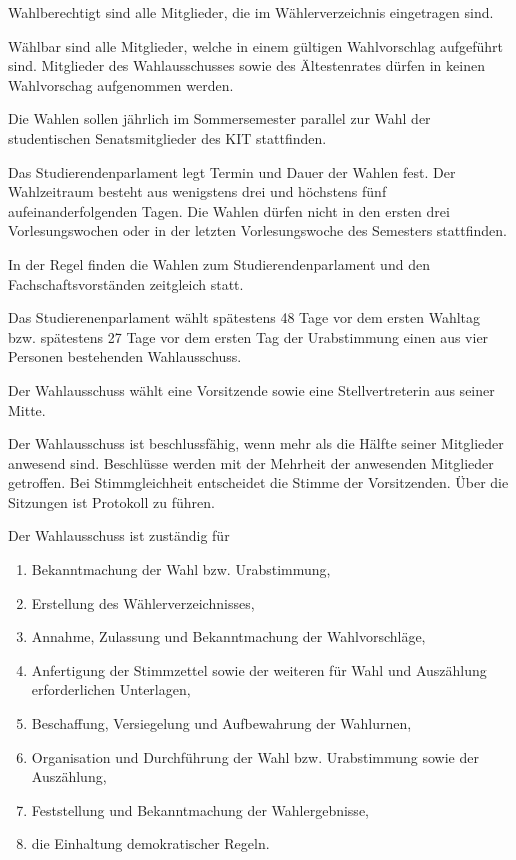 \begin{jurdoc}
Wahlberechtigt sind alle Mitglieder, die im Wählerverzeichnis eingetragen sind.

Wählbar sind alle Mitglieder, welche in einem gültigen Wahlvorschlag aufgeführt sind. Mitglieder des Wahlausschusses sowie des Ältestenrates dürfen in keinen Wahlvorschag aufgenommen werden.

\label{wahl:walhtermin}
Die Wahlen sollen jährlich im Sommersemester parallel zur Wahl der studentischen Senatsmitglieder des KIT stattfinden.

Das Studierendenparlament legt Termin und Dauer der Wahlen fest. Der Wahlzeitraum besteht aus wenigstens drei und höchstens fünf aufeinanderfolgenden Tagen. Die Wahlen dürfen nicht in den ersten drei Vorlesungswochen oder in der letzten Vorlesungswoche des Semesters stattfinden.

In der Regel finden die Wahlen zum Studierendenparlament und den Fachschaftsvorständen zeitgleich statt.

\label{wahl:wahlausschuss}
Das Studierenenparlament wählt spätestens 48 Tage vor dem ersten Wahltag bzw. spätestens 27 Tage vor dem ersten Tag der Urabstimmung einen aus vier Personen bestehenden Wahlausschuss.

Der Wahlausschuss wählt eine Vorsitzende sowie eine Stellvertreterin aus seiner Mitte.

Der Wahlausschuss ist beschlussfähig, wenn mehr als die Hälfte seiner Mitglieder anwesend sind. Beschlüsse werden mit der Mehrheit der anwesenden Mitglieder getroffen. Bei Stimmgleichheit entscheidet die Stimme der Vorsitzenden. Über die Sitzungen ist Protokoll zu führen.

Der Wahlausschuss ist zuständig für
\begin{enumerate}
    \item Bekanntmachung der Wahl bzw. Urabstimmung,
    \item Erstellung des Wählerverzeichnisses,
    \item Annahme, Zulassung und Bekanntmachung der Wahlvorschläge,
    \item Anfertigung der Stimmzettel sowie der weiteren für Wahl und Auszählung erforderlichen Unterlagen,
    \item Beschaffung, Versiegelung und Aufbewahrung der Wahlurnen,
    \item Organisation und Durchführung der Wahl bzw. Urabstimmung sowie der Auszählung,
    \item Feststellung und Bekanntmachung der Wahlergebnisse,
    \item die Einhaltung demokratischer Regeln.
\end{enumerate}


\end{jurdoc}
